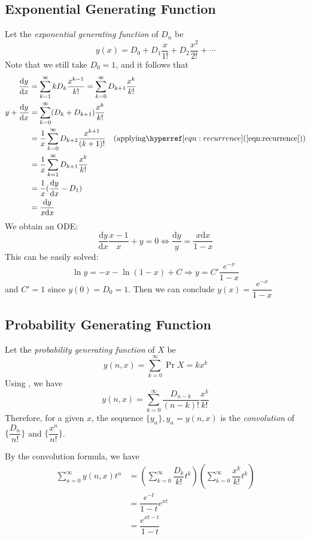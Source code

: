 \subsection{Exponential Generating Function}
Let the \emph{exponential generating function} of $ D_n$ be
\[ y(x) = D_0 +D_1\dfrac{x}{1!}+D_2\dfrac{x^2}{2!}+\cdots \]
Note that we still take $ D_0=1$, and it follows that
\begin{align*}
  \dfrac{\mathrm{d}y}{\mathrm{d}x} &= \sum_{k=1}^{\infty}kD_k\dfrac{x^{k-1}}{k!} = \sum_{k=0}^{\infty}D_{k+1}\dfrac{x^k}{k!} \\
y+\dfrac{\mathrm{d}y}{\mathrm{d}x} &= \sum_{k=0}^{\infty}(D_k+D_{k+1})\dfrac{x^k}{k!} \\
&=\dfrac{1}{x}\sum_{k=0}^{\infty}D_{k+2}\dfrac{x^{k+1}}{(k+1)!} \quad(\text{applying} \eqnref{recurrence}) \\
&= \dfrac{1}{x}\sum_{k=1}^{\infty}D_{k+1}\dfrac{x^{k}}{k!} \\
&= \dfrac{1}{x}(\dfrac{\mathrm{d}y}{\mathrm{d}x}-D_1)\\
&= \dfrac{\mathrm{d}y}{x\mathrm{d}x}
\end{align*}
We obtain an ODE:
\[ \dfrac{\mathrm{d}y}{\mathrm{d}x}\dfrac{x-1}{x}+y = 0\Leftrightarrow \dfrac{\mathrm{d}y}{y}=\dfrac{x\mathrm{d}x}{1-x}\]
  This can be easily solved:
  \[ \ln y = -x-\ln(1-x) +C\Rightarrow y = C'\dfrac{e^{-x}}{1-x} \]
and $ C'=1$ since $ y(0) = D_0=1$. Then we can conclude $ y(x) = \dfrac{e^{-x}}{1-x}$

\subsection{Probability Generating Function}
\label{sec:gf}
Let the \emph{probability generating function} of $ X$ be
\[ y(n,x) = \sum_{k=0}^{\infty}\Pr{X=k}x^k\]
Using , we have
\[ y(n,x) = \sum_{k=0}^{\infty}\dfrac{D_{n-k}}{(n-k)!}\dfrac{x^k}{k!}\]
Therefore, for a given $x$, the sequence $ \{ y_n\}, y_n = y(n,x)$ is the \emph{convolution} of
$ \{ \dfrac{D_n}{n!}\}$ and $ \{ \dfrac{x^n}{n!} \}$.

By the convolution formula, we have
\begin{align*}
  \sum_{n=0}^{\infty} y(n,x)t^n &= \left( \sum_{k=0}^{\infty}\dfrac{D_k}{k!}t^k\right)\left( \sum_{k=0}^{\infty}\dfrac{x^k}{k!}t^k\right) \\
  &=\dfrac{e^{-t}}{1-t}e^{xt} \\
  &= \dfrac{e^{xt-t}}{1-t}
\end{align*}

